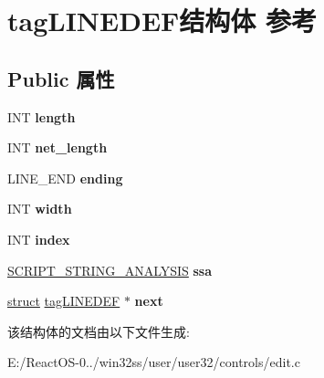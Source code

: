 \hypertarget{structtag_l_i_n_e_d_e_f}{}\section{tag\+L\+I\+N\+E\+D\+E\+F结构体 参考}
\label{structtag_l_i_n_e_d_e_f}
\subsection*{Public 属性}
\begin{DoxyCompactItemize}
\item 
\mbox{\label{structtag_l_i_n_e_d_e_f_a04646316adcb37ffe9804b1a0a2f12be}} 
I\+NT {\bfseries length}
\item 
\mbox{\label{structtag_l_i_n_e_d_e_f_ae52fb497e0913f67d6a60c05f0c01051}} 
I\+NT {\bfseries net\+\_\+length}
\item 
\mbox{\label{structtag_l_i_n_e_d_e_f_ae94fdf8c6449554681ed12504ec7d3a2}} 
L\+I\+N\+E\+\_\+\+E\+ND {\bfseries ending}
\item 
\mbox{\label{structtag_l_i_n_e_d_e_f_a01af5461cbfd40707076398a33338cb9}} 
I\+NT {\bfseries width}
\item 
\mbox{\label{structtag_l_i_n_e_d_e_f_ab3fe61a0e15fe6b22fcc6c01278d52b6}} 
I\+NT {\bfseries index}
\item 
\mbox{\label{structtag_l_i_n_e_d_e_f_a249e47cf5fef73a860a24cbce31446d3}} 
\hyperlink{interfacevoid}{S\+C\+R\+I\+P\+T\+\_\+\+S\+T\+R\+I\+N\+G\+\_\+\+A\+N\+A\+L\+Y\+S\+IS} {\bfseries ssa}
\item 
\mbox{\label{structtag_l_i_n_e_d_e_f_abcc42908ac4339d7ed1640896ce7b275}} 
\hyperlink{interfacestruct}{struct} \hyperlink{structtag_l_i_n_e_d_e_f}{tag\+L\+I\+N\+E\+D\+EF} $\ast$ {\bfseries next}
\end{DoxyCompactItemize}


该结构体的文档由以下文件生成\+:\begin{DoxyCompactItemize}
\item 
E\+:/\+React\+O\+S-\/0../win32ss/user/user32/controls/edit.\+c\end{DoxyCompactItemize}
